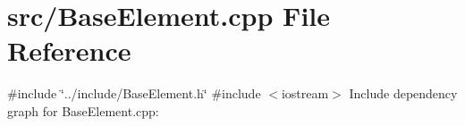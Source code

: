 \section{src/\-Base\-Element.cpp \-File \-Reference}
\label{_base_element_8cpp}
{\ttfamily \#include \char`\"{}../include/\-Base\-Element.\-h\char`\"{}}\*
{\ttfamily \#include $<$iostream$>$}\*
\-Include dependency graph for \-Base\-Element.\-cpp\-:
